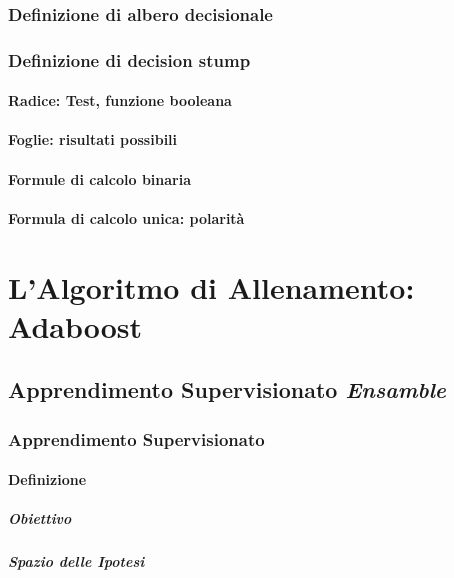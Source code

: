         \subsection{Definizione di albero decisionale}
        \subsection{Definizione di decision stump}
            \subsubsection{Radice: Test, funzione booleana}
            \subsubsection{Foglie: risultati possibili}
            \subsubsection{Formule di calcolo binaria}
            \subsubsection{Formula di calcolo unica: polarità}

\chapter{L'Algoritmo di Allenamento: Adaboost}
\label{chap:adaboost}
    \section{Apprendimento Supervisionato \emph{Ensamble}}
    \label{sec:supervised_ensamble_learning}
        \subsection{Apprendimento Supervisionato}
        \label{sub:supervised_learning}
            \subsubsection{Definizione}
                \paragraph{Obiettivo}
                \paragraph{Spazio delle Ipotesi}
